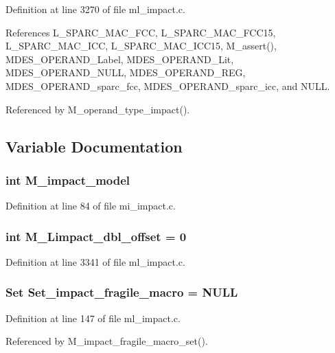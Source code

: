 Definition at line 3270 of file ml\_\-impact.c.

References L\_\-SPARC\_\-MAC\_\-FCC, L\_\-SPARC\_\-MAC\_\-FCC15, L\_\-SPARC\_\-MAC\_\-ICC, L\_\-SPARC\_\-MAC\_\-ICC15, M\_\-assert(), MDES\_\-OPERAND\_\-Label, MDES\_\-OPERAND\_\-Lit, MDES\_\-OPERAND\_\-NULL, MDES\_\-OPERAND\_\-REG, MDES\_\-OPERAND\_\-sparc\_\-fcc, MDES\_\-OPERAND\_\-sparc\_\-icc, and NULL.

Referenced by M\_\-operand\_\-type\_\-impact().

\subsection{Variable Documentation}
\subsubsection{\setlength{\rightskip}{0pt plus 5cm}int \bf{M\_\-impact\_\-model}}\label{ml__impact_8c_6bc09fd2e80115fe0235158cc800ead0}




Definition at line 84 of file mi\_\-impact.c.
\subsubsection{\setlength{\rightskip}{0pt plus 5cm}int \bf{M\_\-Limpact\_\-dbl\_\-offset} = 0}\label{ml__impact_8c_502b354dc87b610d3d50f1660ab9fec7}




Definition at line 3341 of file ml\_\-impact.c.
\subsubsection{\setlength{\rightskip}{0pt plus 5cm}\bf{Set} \bf{Set\_\-impact\_\-fragile\_\-macro} = \bf{NULL}}\label{ml__impact_8c_cf9fefe44d56f6544151601c66634de2}




Definition at line 147 of file ml\_\-impact.c.

Referenced by M\_\-impact\_\-fragile\_\-macro\_\-set().